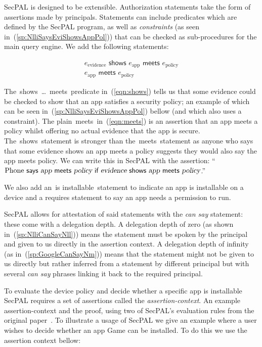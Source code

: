 \documentclass[]{llncs}
\newcommand{\keyword}[1]{\textsf{#1}}
\newcommand{\entity}[1]{\textrm{#1}}
\newcommand{\vari}[1]{\textsl{#1}}
\newcommand{\says}{\keyword{~says~}}
\newcommand{\iffacts}{\keyword{~if~}}
\newcommand{\meets}{\keyword{~meets~}}
\newcommand{\shows}{\keyword{~shows~}}
\newcommand{\installable}{\keyword{~is installable}}
\newcommand{\Phone}{\entity{Phone}}
\newcommand{\App}{\entity{Game}}
\newcommand{\app}{\vari{app}}
\newcommand{\policy}{\vari{policy}}
\newcommand{\eref}[1]{(\ref{#1})}
\begin{document}
SecPAL is designed to be extensible.  Authorization statements take the form of
assertions made by principals.  Statements can include predicates which are
defined by the SecPAL program, as well as \emph{constraints} (as
seen in~\eref{sp:NlliSaysEviShowsAppPol}) that can be checked as sub-procedures
for the main query engine.  We add the following statements: 

\begin{align}
  e_\text{evidence}\shows e_\text{app}\meets e_\text{policy} \label{eqn:shows}\\
  e_\text{app}\meets e_\text{policy} \label{eqn:meets}
\end{align}

The\shows\dots\meets{}predicate in~\eref{eqn:shows} tells us that some evidence
could be checked to show that an app satisfies a security policy; an example of
which can be seen in~\eref{sp:NlliSaysEviShowsAppPol} bellow (and which also
uses a constraint). The plain\meets{}in~\eref{eqn:meets} is an assertion that
an app meets a policy whilst offering no actual evidence that the app is
secure. The\shows{}statement is stronger than the\meets{}statement as anyone
who says that some evidence shows an app meets a policy suggests they would
also say the app meets policy.  We can write this in SecPAL with the assertion:
``\(\Phone\says\app\meets\vari{policy}\iffacts\vari{evidence}\shows\app\meets\policy\).''

We also add an\installable~statement to indicate an app is installable on a
device and a \keyword{requires} statement to say an app needs a permission to
run.

SecPAL allows for attestation of said statements with the \emph{can say}
statement: these come with a delegation depth.  A delegation depth of zero (as
shown in~\eref{sp:NlliCanSayNll}) means the statement must be spoken by the
principal and given to us directly
in the assertion context. A delegation depth of infinity (as
in~\eref{sp:GoogleCanSayNm}) means that the statement might not be given to us
directly but rather inferred from a statement by different principal but with
several  \emph{can say} phrases linking it back to the required principal.



To evaluate the device policy and decide whether a specific app is installable
SecPAL requires a set of assertions called the \emph{assertion-context}. An
example assertion-context and the proof, using two of SecPAL's evaluation rules
from the original paper~\cite{Becker:2006vh}. To illustrate a usage of SecPAL
we give an example where a user wishes to decide whether an app \App{} can be
installed. To do this we use the assertion context bellow:
\end{document}
